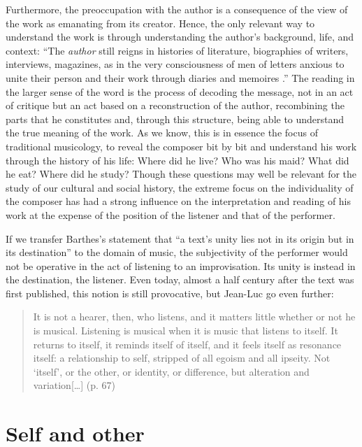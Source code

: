 \documentclass[a4paper]{article}
\begin{document}
Furthermore, the preoccupation with the author is a consequence of the view of the work as emanating from its creator. Hence, the only relevant way to understand the work is through understanding the author's background, life, and context: ``The \emph{author} still reigns in histories of literature, biographies of writers, interviews, magazines, as in the very consciousness of men of letters anxious to unite their person and their work through diaries and memoires \citep[p. 143]{barthes77}.'' The reading in the larger sense of the word is the process of decoding the message, not in an act of critique but an act based on a reconstruction of the author, recombining the parts that he constitutes and, through this structure, being able to understand the true meaning of the work. As we know, this is in essence the focus of traditional musicology, to reveal the composer bit by bit and understand his work through the history of his life: Where did he live? Who was his maid? What did he eat? Where did he study? Though these questions may well be relevant for the study of our cultural and social history, the extreme focus on the individuality of the composer has had a strong influence on the interpretation and reading of his work at the expense of the position of the listener and that of the performer.

If we transfer Barthes's statement that ``a text's unity lies not in its origin but in its destination'' \citep[][p. 148]{barthes77} to the domain of music, the subjectivity of the performer would not be operative in the act of listening to an improvisation. Its unity is instead in the destination, the listener. Even today, almost a half century after the text was first published, this notion is still provocative, but Jean-Luc \citet{nancy2007} go even further:

\begin{quote}
It is not a hearer, then, who listens, and it matters little whether or not he is musical. Listening is musical when it is music that listens to itself. It returns to itself, it reminds itself of itself, and it feels itself as resonance itself: a relationship to self, stripped of all egoism and all ipseity. Not `itself', or the other, or identity, or difference, but alteration and variation[\ldots] (p. 67)
\end{quote}


\section*{Self and other}
\label{sec:improvisation-other}
\end{document}

